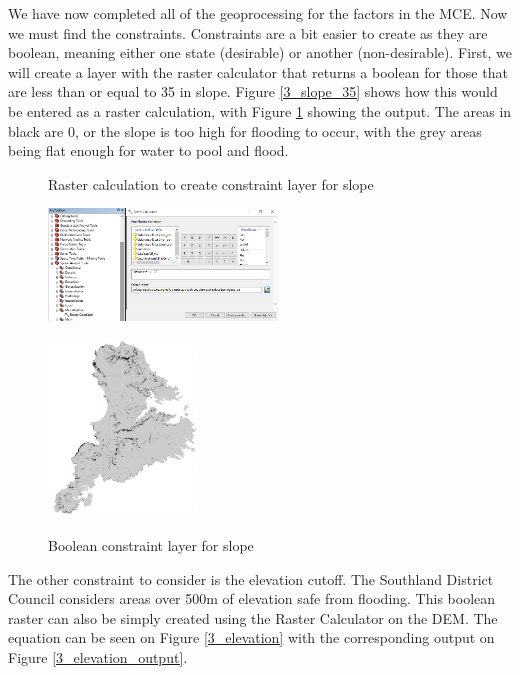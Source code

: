 \documentclass{article}
\begin{document}
We have now completed all of the geoprocessing for the factors in the MCE. Now we must find the constraints. Constraints are a bit easier to create as they are boolean, meaning either one state (desirable) or another (non-desirable). First, we will create a layer with the raster calculator that returns a boolean for those that are less than or equal to 35\textdegree{} in slope. Figure \ref{3_slope_35} shows how this would be entered as a raster calculation, with Figure \ref{3_slope_35_output} showing the output. The areas in black are 0, or the slope is too high for flooding to occur, with the grey areas being flat enough for water to pool and flood.
\begin{figure}[h]
  \centering
  \begin{minipage}[b]{0.5\textwidth}
    \centering
    \caption{Raster calculation to create constraint layer for slope}
    \includegraphics[width=230px]{images/part3/slope_35degorless.PNG}
    \label{3_slope_35}
  \end{minipage}
  \hfill
  \begin{minipage}[b]{0.4\textwidth}
    \centering
    \caption{Boolean constraint layer for slope}
    \includegraphics[width=150px]{images/part3/slope_35degorless_output.PNG}
    \label{3_slope_35_output}
  \end{minipage}
\end{figure} \pagebreak

The other constraint to consider is the elevation cutoff. The Southland District Council considers areas over 500m of elevation safe from flooding. This boolean raster can also be simply created using the Raster Calculator on the DEM. The equation can be seen on Figure \ref{3_elevation} with the corresponding output on Figure \ref{3_elevation_output}. \\
\end{document}
